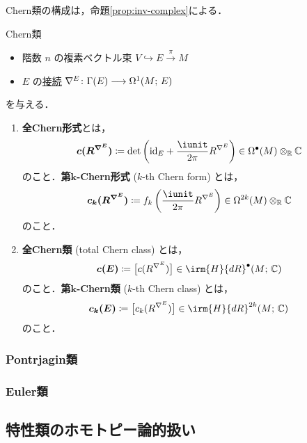 \documentclass[TQFT_main]{subfiles}
\begin{document}
Chern類の構成は，命題\ref{prop:inv-complex}による．

\begin{mydef}[label=def:Chern-class,breakable]{Chern類}
    \begin{itemize}
        \item 階数 $n$ の複素ベクトル束 $V \hookrightarrow E \xrightarrow{\pi} M$
        \item $E$ の\hyperref[def:connection-vect]{接続} $\nabla^E \colon \Gamma(E) \longrightarrow \Omega^1(M;\, E)$
    \end{itemize}
    を与える．
    \begin{enumerate}
        \item \textbf{全Chern形式}とは，
        \begin{align}
            \bm{c (R^{\nabla^E})} \coloneqq \det \left( \mathrm{id}_E + \frac{\iunit}{2\pi} R^{\nabla^E} \right) \in \Omega^{\bullet}(M) \otimes_{\mathbb{R}} \mathbb{C}
        \end{align}
        のこと．\textbf{第$\bm{k}$-Chern形式} ($k$-th Chern form) とは，
        \begin{align}
            \bm{c_k (R^{\nabla^E})} \coloneqq f_k \left( \frac{\iunit}{2\pi} R^{\nabla^E} \right) \in \Omega^{2k}(M) \otimes_{\mathbb{R}} \mathbb{C}
        \end{align}
        のこと．
        \item \textbf{全Chern類} (total Chern class) とは，
        \begin{align}
            \bm{c(E)} \coloneqq \bigl[ c (R^{\nabla^E}) \bigr] \in \irm{H}{dR}^{\bullet} (M;\, \mathbb{C})
        \end{align}
        のこと．\textbf{第$\bm{k}$-Chern類} ($k$-th Chern class) とは，
        \begin{align}
            \bm{c_k (E)} \coloneqq \bigl[ c_k(R^{\nabla^E}) \bigr] \in \irm{H}{dR}^{2k} (M;\, \mathbb{C})
        \end{align}
        のこと．
    \end{enumerate}
\end{mydef}

\subsubsection{Pontrjagin類}


\subsubsection{Euler類}

\subsection{特性類のホモトピー論的扱い}
\end{document}
